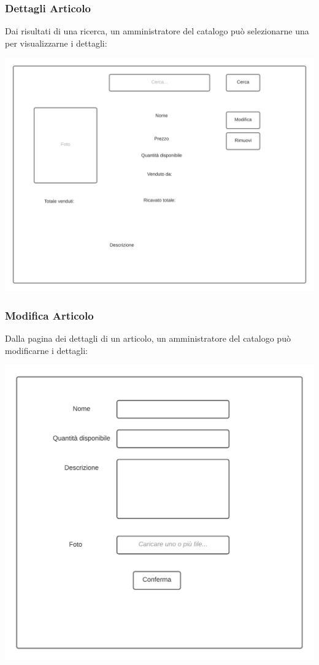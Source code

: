 \documentclass[12pt]{article}
\begin{document}
\subsubsection{Dettagli Articolo}
Dai risultati di una ricerca, un amministratore del catalogo può selezionarne una per visualizzarne i dettagli:

\begin{center}
\includegraphics[height=0.3\textheight]{Mockup/AmministratoreCatalogo/DettagliProdotto}
\end{center}

\newpage

\subsubsection{Modifica Articolo}
Dalla pagina dei dettagli di un articolo, un amministratore del catalogo può modificarne i dettagli:

\begin{center}
\includegraphics[height=0.3\textheight]{Mockup/AmministratoreCatalogo/NuovoArticolo}
\end{center}
\end{document}
